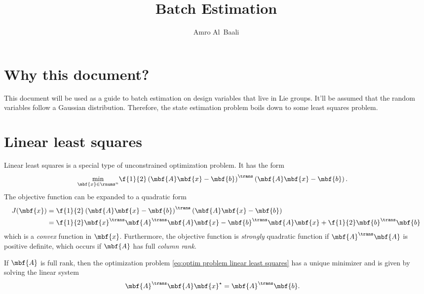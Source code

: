 \documentclass[nobib]{tufte-handout}
\title{Batch Estimation}
\author{Amro Al~Baali}
\begin{document}
    {    
        
        \tableofcontents
        \clearpage
    }

    \section{Why this document?}
    This document will be used as a guide to batch estimation on design variables that live in Lie groups. It'll be assumed that the random variables follow a Gaussian distribution. Therefore, the state estimation problem boils down to some least squares problem.

    \section{Linear least squares}
    Linear least squares is a special type of unconstrained optimization problem. It has the form
    \begin{align}
        \label{eq:optim problem linear least squares}
        \min_{\mbf{x}\in\rnums^{n}} 
        &\f{1}{2}\left( \mbf{A} \mbf{x} - \mbf{b} \right)^{\trans}\left( \mbf{A}\mbf{x} - \mbf{b} \right).
    \end{align}
    The objective function can be expanded to a quadratic form
    \begin{align}
        J(\mbf{x}) 
        &= \f{1}{2}\left( \mbf{A} \mbf{x} - \mbf{b} \right)^{\trans}\left( \mbf{A}\mbf{x} - \mbf{b} \right)\\
        &= \f{1}{2}\mbf{x}^{\trans}\mbf{A}^{\trans}\mbf{A}\mbf{x} - \mbf{b}^{\trans}\mbf{A}\mbf{x} + \f{1}{2}\mbf{b}^{\trans}\mbf{b}
    \end{align}
    which is a \emph{convex} function in $\mbf{x}$. Furthermore, the objective function is \emph{strongly} quadratic function if $\mbf{A}^{\trans}\mbf{A}$ is positive definite, which occurs if $\mbf{A}$ has full \emph{column rank}. 

    If $\mbf{A}$ is full rank, then the optimization problem \eqref{eq:optim problem linear least squares} has a unique minimizer and is given by solving the linear system
    \begin{align}
        \label{eq:linear least squares normal equations}
        \mbf{A}^{\trans}\mbf{A}\mbf{x}^{\star} &= \mbf{A}^{\trans}\mbf{b}.
    \end{align}
\end{document}
